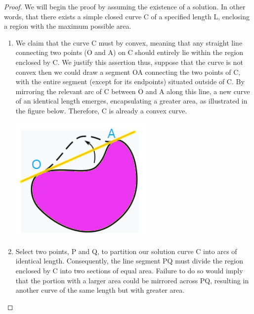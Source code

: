 \documentclass[a4paper]{book}
\numberwithin{theorem}{section}%
\begin{document}
\begin{proof}
    We will begin the proof by assuming the existence of a solution. In other words, that there exists a simple closed curve C of a specified length L, enclosing a region with the maximum possible area.
    \begin{enumerate}
        \item We claim that the curve C must by convex, meaning that any straight line connecting two points (O and A) on C should entirely lie within the region enclosed by C. We justify this assertion thus, suppose that the curve is not convex then we could draw a segment OA connecting the two points of C, with the entire segment (except for its endpoints) situated outside of C. By mirroring the relevant arc of C between O and A along this line, a new curve of an identical length emerges, encapsulating a greater area, as illustrated in the figure below. Therefore, C is already a convex curve.

        \begin{minipage}{\linewidth}
            \centering
            \includegraphics[width=70mm]{isofig1.png}
        \end{minipage}
        \item Select two points, P and Q, to partition our solution curve C into arcs of identical length. Consequently, the line segment PQ must divide the region enclosed by C into two sections of equal area. Failure to do so would imply that the portion with a larger area could be mirrored across PQ, resulting in another curve of the same length but with greater area.


\end{enumerate}
\end{proof}
\end{document}
